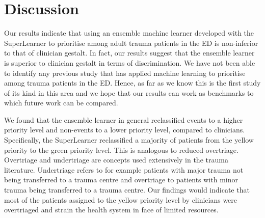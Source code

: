 \documentclass[10pt,letterpaper]{article}\usepackage[]{graphicx}\usepackage[]{color}
\newlength\savedwidth
\newcommand\thickhline{\noalign{\global\savedwidth\arrayrulewidth\global\arrayrulewidth 2pt}%
\hline
\noalign{\global\arrayrulewidth\savedwidth}}
\begin{document}

\section*{Discussion}
Our results indicate that using an ensemble machine learner developed with the
SuperLearner to prioritise among adult trauma patients in the ED is non-inferior
to that of clinician gestalt. In fact, our results suggest that the ensemble
learner is superior to clinician gestalt in terms of discrimination. We have not
been able to identify any previous study that has applied machine learning to
prioritise among trauma patients in the ED. Hence, as far as we know this is the
first study of its kind in this area and we hope that our results can work as
benchmarks to which future work can be compared.

We found that the ensemble learner in general reclassified events to a higher
priority level and non-events to a lower priority level, compared to
clinicians. Specifically, the SuperLearner reclassified a majority of patients
from the yellow priority to the green priority level. This is analogous to
reduced overtriage. Overtriage and undertriage are concepts used extensively in
the trauma literature. Undertriage refers to for example patients with major
trauma not being transferred to a trauma centre and overtriage to patients with
minor trauma being transferred to a trauma centre. Our findings would indicate
that most of the patients assigned to the yellow priority level by clinicians
were overtriaged and strain the health system in face of limited resources.
\end{document}
